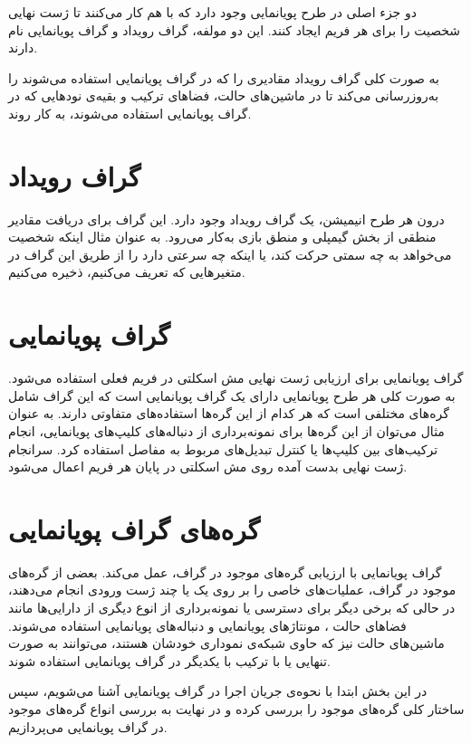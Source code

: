 دو جزء اصلی در طرح پویانمایی وجود دارد که با هم کار می‌کنند تا ژست نهایی شخصیت را برای هر 
فریم ایجاد کنند.
این دو مولفه، گراف رویداد و گراف پویانمایی نام دارند.

به صورت کلی گراف رویداد مقادیری را که در گراف پویانمایی استفاده می‌شوند را به‌روز‌رسانی می‌‌کند تا 
در ماشین‌های حالت، فضاهای ترکیب و بقیه‌ی نود‌هایی که در گراف پویانمایی
 استفاده می‌شوند، به کار روند.

\section{گراف رویداد}

درون هر طرح انیمیشن، یک گراف رویداد وجود دارد. 
این گراف برای دریافت مقادیر منطقی از بخش گیمپلی و منطق بازی به‌کار می‌رود.
به عنوان مثال اینکه شخصیت می‌خواهد به چه سمتی حرکت کند، یا اینکه چه سرعتی دارد را 
از طریق این گراف در متغیرهایی که تعریف می‌کنیم، ذخیره می‌کنیم.
\cite{EventGraphUnrealEngine}

\section{گراف پویا‌نمایی}

گراف پویانمایی برای ارزیابی ژست نهایی مش اسکلتی در فریم فعلی استفاده می‌شود.
به صورت کلی هر طرح پویانمایی دارای یک گراف پویانمایی است که 
این گراف شامل گره‌های مختلفی است که هر کدام از این گره‌ها استفاده‌های متفاوتی دارند.
به عنوان مثال می‌توان از این گره‌ها برای نمونه‌برداری
از دنباله‌های کلیپ‌های پویانمایی،
انجام ترکیب‌های بین کلیپ‌ها 
یا کنترل تبدیل‌های مربوط به مفاصل استفاده کرد.
سرانجام ژست نهایی بدست آمده روی 
مش اسکلتی در پایان هر فریم اعمال می‌شود.

\section{گره‌های گراف پویانمایی }

گراف پویا‌نمایی با ارزیابی گره‌های موجود در گراف، عمل می‌کند.
بعضی از گره‌های موجود در گراف، عملیات‌های خاصی را بر روی یک یا چند
ژست ورودی انجام می‌دهند، در حالی که برخی دیگر 
برای دسترسی یا نمونه‌برداری از انوع دیگری از دارایی‌ها مانند
فضاهای حالت
، مونتاژهای پویانمایی
و دنباله‌های پویا‌نمایی
استفاده می‌شوند.
ماشین‌های حالت نیز که حاوی شبکه‌ی نموداری خودشان هستند، می‌توانند 
به صورت تنهایی یا با ترکیب با یکدیگر در 
گراف پویانمایی استفاده شوند.

در این بخش ابتدا با نحوه‌‌ی جریان اجرا در گراف پویانمایی 
آشنا می‌شویم، سپس ساختار کلی گره‌های موجود را بررسی کرده و در نهایت 
به بررسی انواع گره‌‌های موجود در گراف پویانمایی می‌پردازیم.



